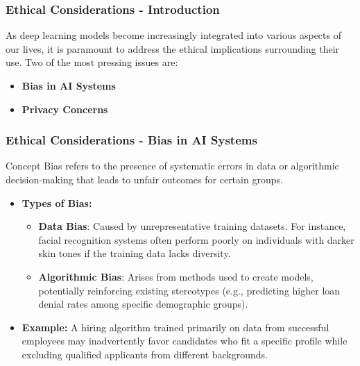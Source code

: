 \documentclass[aspectratio=169]{beamer}
\begin{document}
\begin{frame}[fragile]
    \frametitle{Ethical Considerations - Introduction}
    As deep learning models become increasingly integrated into various aspects of our lives, it is paramount to address the ethical implications surrounding their use. Two of the most pressing issues are:
    
    \begin{itemize}
        \item \textbf{Bias in AI Systems}
        \item \textbf{Privacy Concerns}
    \end{itemize}
\end{frame}

\begin{frame}[fragile]
    \frametitle{Ethical Considerations - Bias in AI Systems}
    \begin{block}{Concept}
        Bias refers to the presence of systematic errors in data or algorithmic decision-making that leads to unfair outcomes for certain groups.
    \end{block}

    \begin{itemize}
        \item \textbf{Types of Bias:}
        \begin{itemize}
            \item \textbf{Data Bias}:
            Caused by unrepresentative training datasets. For instance, facial recognition systems often perform poorly on individuals with darker skin tones if the training data lacks diversity.
            \item \textbf{Algorithmic Bias}:
            Arises from methods used to create models, potentially reinforcing existing stereotypes (e.g., predicting higher loan denial rates among specific demographic groups).
        \end{itemize}
        
        \item \textbf{Example:}
        A hiring algorithm trained primarily on data from successful employees may inadvertently favor candidates who fit a specific profile while excluding qualified applicants from different backgrounds.
    \end{itemize}
\end{frame}
\end{document}

